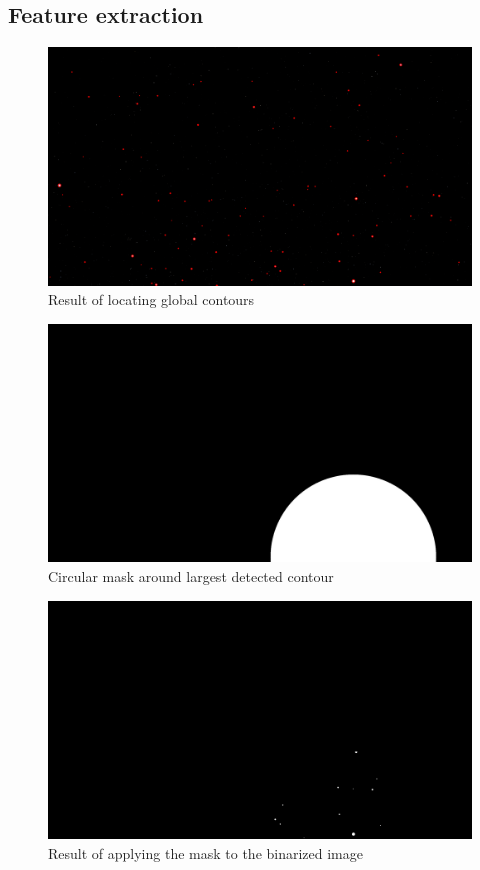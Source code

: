 \documentclass[10pt,twocolumn,letterpaper]{article}
\begin{document}
\subsection{Feature extraction}

\begin{figure}[h]
  \centering
   \includegraphics[width=0.9\linewidth]{all_contours}
   \caption{Result of locating global contours}
   \label{fig:star_contours}
\end{figure}

\begin{figure}[h]
  \centering
   \includegraphics[width=0.9\linewidth]{mask}
   \caption{Circular mask around largest detected contour}
   \label{fig:star_mask}
\end{figure}

\begin{figure}[h]
  \centering
   \includegraphics[width=0.9\linewidth]{masked}
   \caption{Result of applying the mask to the binarized image}
   \label{fig:star_masked}
\end{figure}
\end{document}
